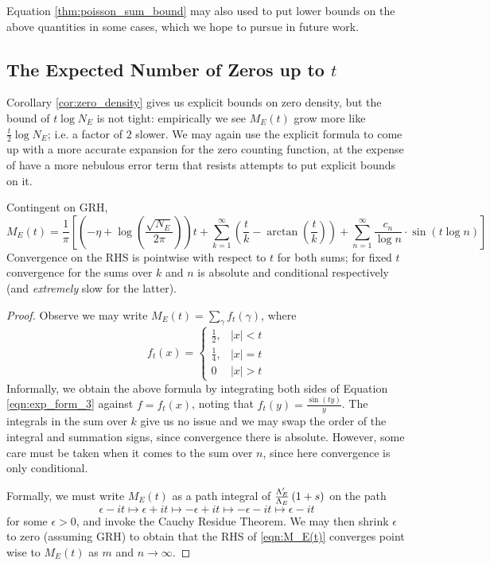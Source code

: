Equation \ref{thm:poisson_sum_bound} may also used to put lower bounds on the above quantities in some cases, which we hope to pursue in future work.

\newpage
\subsection{The Expected Number of Zeros up to $t$}

Corollary \ref{cor:zero_density} gives us explicit bounds on zero density, but the bound of $t \log N_E$ is not tight: empirically we see $M_E(t)$ grow more like $\frac{t}{2}\log N_E$; i.e. a factor of $2$ slower. We may again use the explicit formula to come up with a more accurate expansion for the zero counting function, at the expense of have a more nebulous error term that resists attempts to put explicit bounds on it.

\begin{proposition}
Contingent on GRH,
\begin{equation}\label{eqn:M_E(t)}
M_E(t) = \frac{1}{\pi}\left[\left(-\eta+\log\left(\frac{\sqrt{N_E}}{2\pi}\right)\right) t + \sum_{k=1}^{\infty} \left(\frac{t}{k} - \arctan\left(\frac{t}{k}\right)\right) + \sum_{n=1}^{\infty} \frac{c_n}{\log n}\cdot \sin(t\log n)\right]
\end{equation}
Convergence on the RHS is pointwise with respect to $t$ for both sums; for fixed $t$ convergence for the sums over $k$ and $n$ is absolute and conditional respectively (and {\it extremely} slow for the latter).
\end{proposition}

\begin{proof}
Observe we may write $M_E(t) = \sum_{\gamma}f_t(\gamma)$, where
\begin{equation}
f_t(x) = \begin{cases} \frac{1}{2}, & |x|<t \\ \frac{1}{4}, & |x| = t \\ 0 & |x|> t \end{cases}
\end{equation}
Informally, we obtain the above formula by integrating both sides of Equation \ref{eqn:exp_form_3} against $f = f_t(x)$, noting that $\hat{f}_t(y) = \frac{\sin(ty)}{y}$. The integrals in the sum over $k$ give us no issue and we may swap the order of the integral and summation signs, since convergence there is absolute. However, some care must be taken when it comes to the sum over $n$, since here convergence is only conditional. 

Formally, we must write $M_E(t)$ as a path integral of $\frac{\Lambda_E^{\prime}}{\Lambda_E}\left(1+s\right)$ on the path
\begin{equation*}
\epsilon-it \mapsto \epsilon+it \mapsto -\epsilon+it \mapsto -\epsilon-it \mapsto \epsilon-it
\end{equation*}
for some $\epsilon>0$, and invoke the Cauchy Residue Theorem. We may then shrink $\epsilon$ to zero (assuming GRH) to obtain that the RHS of \ref{eqn:M_E(t)} converges point wise to $M_E(t)$ as $m$ and $n \to \infty$.
\end{proof}

